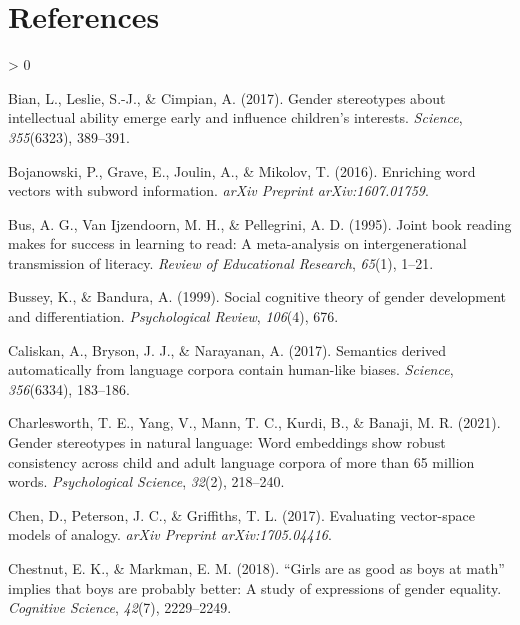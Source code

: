 \documentclass[
  english,
  ,man,floatsintext]{apa6}
\newlength{\cslhangindent}
\newenvironment{CSLReferences}[2] %
 {%
  \setlength{\parindent}{0pt}
  \ifodd #1 \everypar{\setlength{\hangindent}{\cslhangindent}}\ignorespaces\fi
  \ifnum #2 > 0
  \setlength{\parskip}{#2\baselineskip}
  \fi
 }%
 {}
\begin{document}
\hypertarget{references}{%
\section{References}\label{references}}

\setlength{\parindent}{-0.5in}
\setlength{\leftskip}{0.5in}

\hypertarget{refs}{}
\begin{CSLReferences}{1}{0}
\leavevmode\hypertarget{ref-bian2017gender}{}%
Bian, L., Leslie, S.-J., \& Cimpian, A. (2017). Gender stereotypes about intellectual ability emerge early and influence children's interests. \emph{Science}, \emph{355}(6323), 389--391.

\leavevmode\hypertarget{ref-bojanowski2016enriching}{}%
Bojanowski, P., Grave, E., Joulin, A., \& Mikolov, T. (2016). Enriching word vectors with subword information. \emph{arXiv Preprint arXiv:1607.01759}.

\leavevmode\hypertarget{ref-bus1995joint}{}%
Bus, A. G., Van Ijzendoorn, M. H., \& Pellegrini, A. D. (1995). Joint book reading makes for success in learning to read: A meta-analysis on intergenerational transmission of literacy. \emph{Review of Educational Research}, \emph{65}(1), 1--21.

\leavevmode\hypertarget{ref-bussey1999social}{}%
Bussey, K., \& Bandura, A. (1999). Social cognitive theory of gender development and differentiation. \emph{Psychological Review}, \emph{106}(4), 676.

\leavevmode\hypertarget{ref-caliskan2017semantics}{}%
Caliskan, A., Bryson, J. J., \& Narayanan, A. (2017). Semantics derived automatically from language corpora contain human-like biases. \emph{Science}, \emph{356}(6334), 183--186.

\leavevmode\hypertarget{ref-charlesworth2021gender}{}%
Charlesworth, T. E., Yang, V., Mann, T. C., Kurdi, B., \& Banaji, M. R. (2021). Gender stereotypes in natural language: Word embeddings show robust consistency across child and adult language corpora of more than 65 million words. \emph{Psychological Science}, \emph{32}(2), 218--240.

\leavevmode\hypertarget{ref-chen2017evaluating}{}%
Chen, D., Peterson, J. C., \& Griffiths, T. L. (2017). Evaluating vector-space models of analogy. \emph{arXiv Preprint arXiv:1705.04416}.

\leavevmode\hypertarget{ref-chestnut2018girls}{}%
Chestnut, E. K., \& Markman, E. M. (2018). {``Girls are as good as boys at math''} implies that boys are probably better: A study of expressions of gender equality. \emph{Cognitive Science}, \emph{42}(7), 2229--2249.


\end{CSLReferences}
\end{document}
